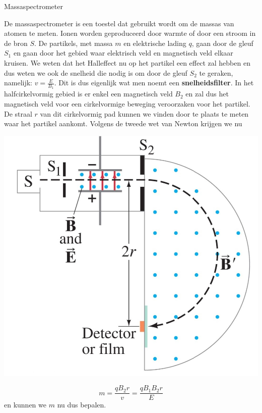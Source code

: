 
\begin{app}[Massaspectrometer]{Massaspectrometer}
    \vspace{-0.15cm}
    \begin{minipage}{.7\textwidth}
        De massaspectrometer is een toestel dat gebruikt wordt om de massas van atomen te meten.
        Ionen worden geproduceerd door warmte of door een stroom in de bron $S$.  De partikels, met massa $m$ en elektrische lading $q$, 
        gaan door de gleuf $S_{1}$ en gaan door het gebied waar elektrisch veld en magnetisch veld elkaar kruisen. We weten dat 
        het Halleffect nu op het partikel een effect zal hebben en dus weten we ook de snelheid die nodig is om door de gleuf $S_{2}$ 
        te geraken, namelijk: $v = \tfrac{E}{B_{1}}$. Dit is dus eigenlijk wat men noemt een \textbf{snelheidsfilter}. 
        In het halfcirkelvormig gebied is er enkel een magnetisch veld $B_{2}$ en zal dus het magnetisch veld voor een cirkelvormige beweging veroorzaken voor het partikel. 
        De straal $r$ van dit cirkelvormig pad kunnen we vinden door te plaats te meten waar het partikel aankomt. Volgens de tweede wet van Newton krijgen we nu 
    \end{minipage}
    \begin{minipage}{.28\textwidth}
        \vspace{-0.25cm}
        \includegraphics[scale = 0.5]{Images/Magnetisme/Massaspectrometer.png}
    \end{minipage}
    \vspace{0.25cm}

    \begin{equation*}
        m = \dfrac{qB_{2}r}{v} = \dfrac{qB_{1}B_{2}r}{E}
    \end{equation*}
    en kunnen we $m$ nu dus bepalen.
\end{app}